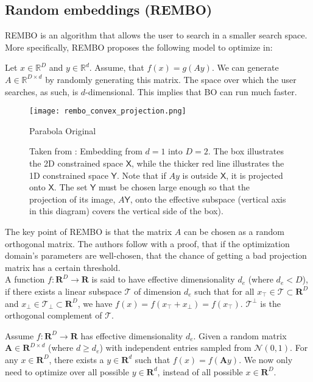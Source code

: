 \subsection{Random embeddings (REMBO)}
REMBO is an algorithm that allows the user to search in a smaller search space.
More specifically, REMBO proposes the following model to optimize in:


\citep{Wang2013} Let $x \in \mathbb{R}^D$ and $y \in \mathbb{R}^d$. Assume, that $f(x) = g(Ay)$. We can generate $A \in \mathbb{R}^{D \times d}$ by randomly generating this matrix.
The space over which the user searches, as such, is $d$-dimensional.
This implies that BO can run much faster. \\

\begin{figure}[H]
    \centering
        \texttt{[image: rembo\_convex\_projection.png]}
        \caption{Parabola Original}
        \label{fig:gull}
    \caption{
    Taken from \citep{Wang2013}: Embedding from $d = 1$ into $D=2$.
    The box illustrates the 2D constrained space $\mathsf{X}$, while the thicker red line illustrates the 1D constrained space $\mathsf{Y}$.
    Note that if $Ay$ is outside $\mathsf{X}$, it is projected onto $\mathsf{X}$.
    The set $\mathsf{Y}$ must be chosen large enough so that the projection of its image, $A\mathsf{Y}$, onto the effective subspace (vertical axis in this diagram) covers the vertical side of the box).
    }\label{fig:animals}
\end{figure}

The key point of REMBO is that the matrix $A$ can be chosen as a random orthogonal matrix.
The authors follow with a proof, that if the optimization domain's parameters are well-chosen, that the chance of getting a bad projection matrix has a certain threshold. \\

\cite{Wang}
A function $f : \mathbf{R}^D \rightarrow \mathbf{R}$ is said to have effective dimensionality $d_e$ (where $d_e < D$), if there exists a linear subspace $\mathcal{T}$ of dimension $d_e$ such that for all $ x_\top \in \mathcal{T} \subset \mathbf{R}^D $ and $x_\perp \in \mathcal{T_\perp} \subset \mathbf{R}^D $, we have $ f(x) = f(x_\top +x_\perp ) = f(x_\top)$.
$\mathcal{T^\perp}$ is the orthogonal complement of $\mathcal{T}$.

Assume $ f : \mathbf{R}^D \rightarrow \mathbf{R} $ has effective dimensionality $d_e$.
Given a random matrix $ \mathbf{A} \in \mathbf{R}^{D \times d} $ (where $d \geq d_e$) with independent entries sampled from $ \mathcal{N}(0, 1) $.
For any $ x \in \mathbf{R}^D $, there exists a $y \in \mathbf{R}^d $ such that $ f(x) = f(\mathbf{A} y ) $.
We now only need to optimize over all possible $y \in \mathbf{R}^d$, instead of all possible $x \in \mathbf{R}^D $. \\


